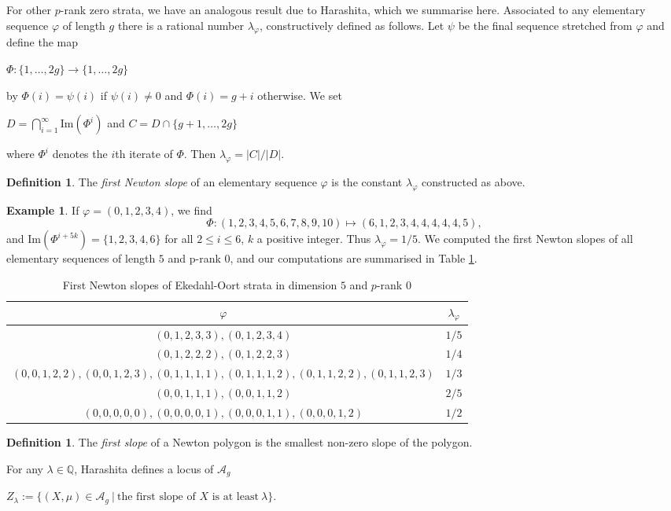 \documentclass[11pt,table]{amsart}
\numberwithin{equation}{section}
\theoremstyle{definition}
\newtheorem{defn}[thm]{Definition}
\newtheorem{eg}[thm]{Example}
\theoremstyle{remark}
\theoremstyle{remark}
\begin{document}
For other $p$-rank zero strata, we have an analogous result due to Harashita, which we summarise here. Associated to any elementary sequence $\varphi$ of length $g$ there is a rational number $\lambda_{\varphi}$, constructively defined as follows. Let $\psi$ be the final sequence stretched from $\varphi$ and define the map 
\begin{center}
 $\Phi : \{ 1, \ldots, 2g\} \rightarrow \{ 1, \ldots, 2g \}$   
\end{center}
by $ \Phi(i) = \psi(i)$ if $ \psi(i) \ne 0$ and $\Phi(i) = g + i$ otherwise. We set 
\begin{center}
    $D = \displaystyle \bigcap_{i=1}^{\infty} \text{Im}(\Phi^{i})$ and $C = D \cap \{ g+1, \ldots, 2g\}$
\end{center}
where $\Phi^{i}$ denotes the $i$th iterate of $\Phi$. Then $\lambda_{\varphi} = \vert C \vert / \vert D \vert $. 
\begin{defn}
The \textit{first Newton slope} of an elementary sequence $\varphi$ is the constant $\lambda_{\varphi}$ constructed as above.
\end{defn}
\begin{eg}
  If $\varphi = (0,1,2,3,4)$, we find 
  $$ \Phi : (1,2,3,4,5,6,7,8,9,10) \mapsto (6,1,2,3,4,4,4,4,4,5),$$
and $\text{Im}(\Phi^{i+5k}) = \{ 1,2,3,4,6\} $ for all $2 \le i \le 6$, $k$ a positive integer. Thus $\lambda_{\varphi} = 1/5$. We computed the first Newton slopes of all elementary sequences of length $5$ and p-rank $0$, and our computations are summarised in  Table \ref{tab:firstslopes}.
\end{eg}
\begin{table}
    \centering
    \begin{tabular}{|c|c|}
    \hline
    $\varphi$ &  $\lambda_{\varphi}$ \\
    \hline 
    $(0,1,2,3,3), (0,1,2,3,4) $ & $1/5$   \\
    $(0,1,2,2,2), (0,1,2,2,3) $ & $1/4 $ \\
    $ (0,0,1,2,2), (0,0,1,2,3), (0,1,1,1,1), (0,1,1,1,2),  (0,1,1,2,2), (0,1,1,2,3) $   & $1/3$ \\
    $(0,0,1,1,1), (0,0,1,1,2)  $  & $ 2/5 $ \\
    $ (0,0,0,0,0), (0,0,0,0,1), (0,0,0,1,1), (0,0,0,1,2)  $ & $1/2$ \\
    \hline     
    \end{tabular}
      \caption{First Newton slopes of Ekedahl-Oort strata in dimension $5$ and $p$-rank $0$}
    \label{tab:firstslopes}
    \end{table}
\begin{defn}
The \textit{first slope} of a Newton polygon is the smallest non-zero slope of the polygon.     
\end{defn}
For any $\lambda \in \mathbb{Q}$, Harashita defines a locus of $\mathcal{A}_g$
\begin{center}
    $Z_{\lambda} := \{ ( X, \mu) \in \mathcal{A}_{g}  \ \vert \ \text{the first slope of $X$ is at least} \  \lambda \}.$
\end{center}
\end{document}
